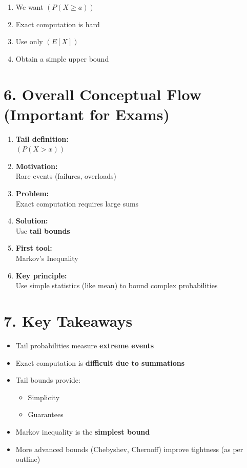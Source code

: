 \documentclass[12pt]{article}
\begin{document}
\begin{enumerate}
\item We want $(P(X \ge a))$
\item Exact computation is hard
\item Use only $(E[X])$
\item Obtain a simple upper bound
\end{enumerate}

\section*{6. Overall Conceptual Flow (Important for Exams)}

\begin{enumerate}
\item \textbf{Tail definition:} \\
$(P(X > x))$

\item \textbf{Motivation:} \\
Rare events (failures, overloads)

\item \textbf{Problem:} \\
Exact computation requires large sums

\item \textbf{Solution:} \\
Use \textbf{tail bounds}

\item \textbf{First tool:} \\
Markov's Inequality

\item \textbf{Key principle:} \\
Use simple statistics (like mean) to bound complex probabilities
\end{enumerate}

\section*{7. Key Takeaways}

\begin{itemize}
\item Tail probabilities measure \textbf{extreme events}
\item Exact computation is \textbf{difficult due to summations}
\item Tail bounds provide:
\begin{itemize}
\item Simplicity
\item Guarantees
\end{itemize}
\item Markov inequality is the \textbf{simplest bound}
\item More advanced bounds (Chebyshev, Chernoff) improve tightness (as per outline)
\end{itemize}
\end{document}
